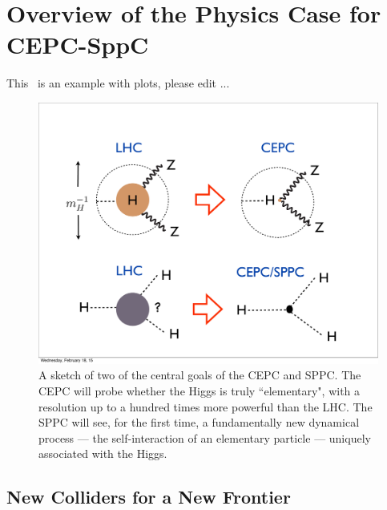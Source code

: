 \chapter{Overview of the Physics Case for CEPC-SppC}
\label{Chapter:Theory}


This~\cite{cepc_website} is an example with plots, please edit ... 
%
\begin{figure}[h!]
\centering
\includegraphics[scale=0.36]{Figures/Theory/main_theme}
\caption{A sketch of two of the central goals of the CEPC and SPPC. The CEPC will probe whether the Higgs is truly ``elementary", with a resolution up to a hundred times more powerful than the LHC. The SPPC will see, for the first time, a fundamentally new dynamical process --- the self-interaction of an elementary particle --- uniquely associated with the Higgs.}
\label{fig:main_theme}
\end{figure}
%
\section{New Colliders for a New Frontier}


